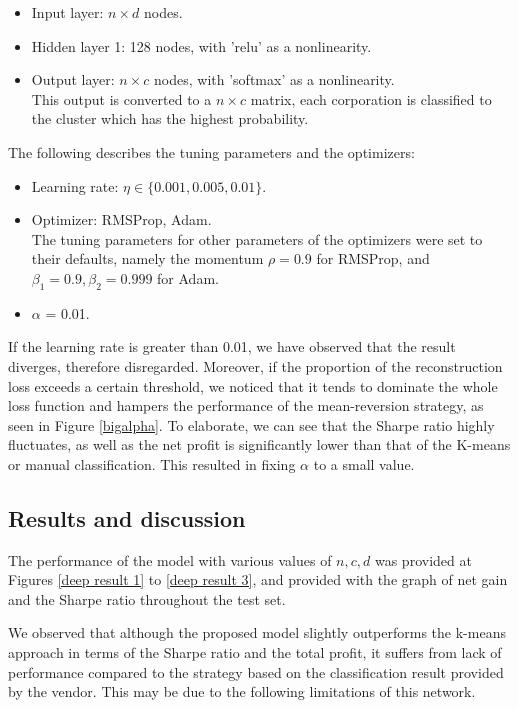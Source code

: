 \documentclass[11pt]{article}
\begin{document}
\begin{itemize}
    \item Input layer: $n \times d$ nodes.
    \item Hidden layer 1: 128 nodes, with 'relu' as a nonlinearity.
    \item Output layer: $n \times c$ nodes, with 'softmax' as a nonlinearity. \\
    This output is converted to a $n \times c$ matrix, each corporation is classified to the cluster which has the highest probability.
\end{itemize}

The following describes the tuning parameters and the optimizers:

\begin{itemize}
    \item Learning rate: $\eta \in \{ 0.001, 0.005, 0.01 \}.$
    \item Optimizer: RMSProp, Adam. \\
    The tuning parameters for other parameters of the optimizers were set to their defaults, namely the momentum $\rho = 0.9$ for RMSProp, and $\beta_1 = 0.9, \beta_2 = 0.999$ for Adam.
    \item $\alpha$ = 0.01.
\end{itemize}

If the learning rate is greater than 0.01, we have observed that the result diverges, therefore disregarded. Moreover, if the proportion of the reconstruction loss exceeds a certain threshold, we noticed that it tends to dominate the whole loss function and hampers the performance of the mean-reversion strategy, as seen in Figure \ref{bigalpha}. To elaborate, we can see that the Sharpe ratio highly fluctuates, as well as the net profit is significantly lower than that of the K-means or manual classification. This resulted in fixing $\alpha$ to a small value.

\subsection{Results and discussion}
The performance of the model with various values of $n, c, d$ was provided at Figures \ref{deep result 1} to \ref{deep result 3}, and provided with the graph of net gain and the Sharpe ratio throughout the test set.

We observed that although the proposed model slightly outperforms the k-means approach in terms of the Sharpe ratio and the total profit, it suffers from lack of performance compared to the strategy based on the classification result provided by the vendor. This may be due to the following limitations of this network.
\end{document}
